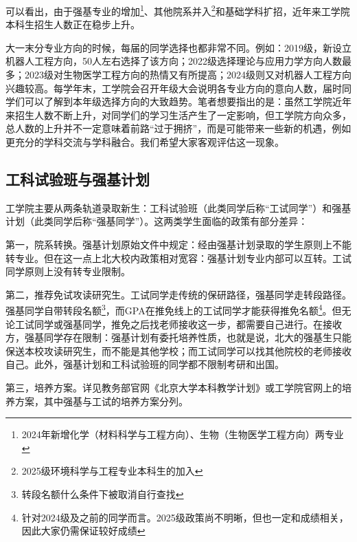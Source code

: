 \documentclass[11pt,oneside]{book}
\begin{document}
可以看出，由于强基专业的增加\footnote{2024年新增化学（材料科学与工程方向）、生物（生物医学工程方向）两专业}、其他院系并入\footnote{2025级环境科学与工程专业本科生的加入}和基础学科扩招，近年来工学院本科生招生人数正在稳步上升。

\vspace{10pt}

大一末分专业方向的时候，每届的同学选择也都非常不同。例如：2019级，新设立机器人工程方向，50人左右选择了该方向；2022级选择理论与应用力学方向人数最多；2023级对生物医学工程方向的热情又有所提高；2024级则又对机器人工程方向兴趣较高。每学年末，工学院会召开年级大会说明各专业方向的意向人数，届时同学们可以了解到本年级选择方向的大致趋势。笔者想要指出的是：虽然工学院近年来招生人数不断上升，对同学们的学习生活产生了一定影响，但工学院方向众多，总人数的上升并不一定意味着前路“过于拥挤”，而是可能带来一些新的机遇，例如更充分的学科交流与学科融合。我们希望大家客观评估这一现象。
        
\subsection{工科试验班与强基计划}
工学院主要从两条轨道录取新生：工科试验班（此类同学后称“工试同学”）和强基计划（此类同学后称“强基同学”）。这两类学生面临的政策有部分差异：

\vspace{10pt}

第一，院系转换。强基计划原始文件中规定：经由强基计划录取的学生原则上不能转专业。但在这一点上北大校内政策相对宽容：强基计划专业内部可以互转。工试同学原则上没有转专业限制。

\vspace{20pt}

第二，推荐免试攻读研究生。工试同学走传统的保研路径，强基同学走转段路径。强基同学自带转段名额\footnote{转段名额什么条件下被取消自行查找}，而GPA在推免线上的工试同学才能获得推免名额\footnote{针对2024级及之前的同学而言。2025级政策尚不明晰，但也一定和成绩相关，因此大家仍需保证较好成绩}。但无论工试同学或强基同学，推免之后找老师接收这一步，都需要自己进行。在接收方，强基同学存在限制：强基计划有委托培养性质，也就是说，北大的强基生只能保送本校攻读研究生，而不能是其他学校；而工试同学可以找其他院校的老师接收自己。此外，强基计划和工科试验班的同学都不限制考研和出国。

\vspace{10pt}

第三，培养方案。详见教务部官网《北京大学本科教学计划》或工学院官网上的培养方案，其中强基与工试的培养方案分列。

\vspace{10pt}
\end{document}
